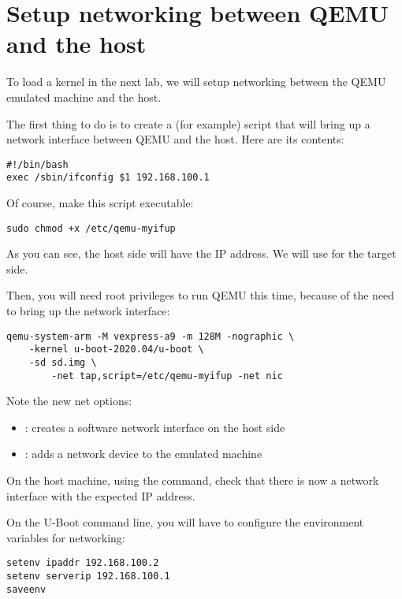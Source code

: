 \section{Setup networking between QEMU and the host}

To load a kernel in the next lab, we will setup networking between the QEMU emulated
machine and the host.

The first thing to do is to create a  (for example)
script that will bring up a network interface between QEMU and the host. Here are its contents:

\begin{verbatim}
#!/bin/bash
exec /sbin/ifconfig $1 192.168.100.1
\end{verbatim}

Of course, make this script executable:
\begin{verbatim}
sudo chmod +x /etc/qemu-myifup
\end{verbatim}

As you can see, the host side will have the  IP
address. We will use  for the target side.

Then, you will need root privileges to run QEMU this time,
because of the need to bring up the network interface:

\begin{verbatim}
qemu-system-arm -M vexpress-a9 -m 128M -nographic \
	-kernel u-boot-2020.04/u-boot \
	-sd sd.img \
        -net tap,script=/etc/qemu-myifup -net nic
\end{verbatim}

Note the new net options:
\begin{itemize}
\item {}: creates a software network interface on the host side
\item \code{-net nic}: adds a network device to the emulated machine
\end{itemize}

On the host machine, using the \code{ifconfig} command, check that
there is now a  network interface with the expected IP
address.

On the U-Boot command line, you will have to configure the environment
variables for networking:

\begin{verbatim}
setenv ipaddr 192.168.100.2
setenv serverip 192.168.100.1
saveenv
\end{verbatim}

